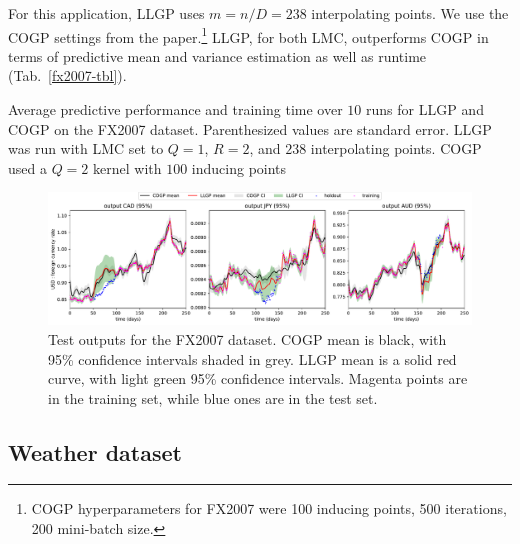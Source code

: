 \documentclass{article}
\begin{document}
For this application, LLGP uses $m=n/D=238$ interpolating points. We use the COGP settings from the paper.\footnote{COGP hyperparameters for FX2007 were 100 inducing points, 500 iterations, 200 mini-batch size.} LLGP, for both LMC, outperforms COGP in terms of predictive mean and variance estimation as well as runtime (Tab.~\ref{fx2007-tbl}).

\begin{table}[!ht]
  \caption{Average predictive performance and training time over $10$ runs for LLGP and COGP on the FX2007 dataset. Parenthesized values are standard error. LLGP was run with LMC set to $Q=1$, $R=2$, and $238$ interpolating points. COGP used a $Q=2$ kernel with $100$ inducing points}
\label{fx2007-tbl}
\vskip 0.15in
\begin{center}
  \begin{small}
    \begin{sc}
      
\end{sc}
\end{small}
\end{center}
\vskip -0.1in
\end{table}

\begin{figure}[!ht]
\vskip 0.2in
\begin{center}
\centerline{\includegraphics[width=\textwidth]{fx2007graph.pdf}}
\caption{Test outputs for the FX2007 dataset. COGP mean is black, with 95\% confidence intervals shaded in grey. LLGP mean is a solid red curve, with light green 95\% confidence intervals. Magenta points are in the training set, while blue ones are in the test set.} %
\label{fx2007-graph}
\end{center}
\vskip -0.2in
\end{figure}

\subsection{Weather dataset}\label{large-bench}
\end{document}
